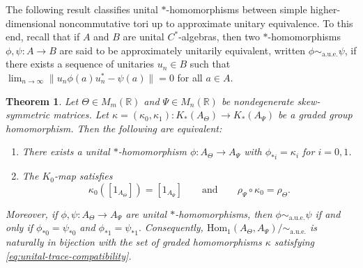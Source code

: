 \documentclass[11pt]{amsart}
\newtheorem{theorem}{Theorem}[section]
\theoremstyle{definition}
\theoremstyle{remark}
\newcommand{\R}{\mathbb{R}}
\newcommand{\aue}{\sim_{\mathrm{a.u.e.}}}
\begin{document}
The following result classifies unital $*$-homomorphisms between simple
higher-dimensional noncommutative tori up to approximate unitary equivalence. To this end, recall that if $A$ and $B$ are unital $C^*$-algebras, then two $*$-homomorphisms
$\phi,\psi\colon A\to B$ are said to be approximately unitarily equivalent,
written $\phi\aue\psi$, if there exists a sequence of unitaries
$u_n\in B$ such that $\lim_{n\to\infty}\|u_n\phi(a)u_n^*-\psi(a)\|=0$
for all $a\in A.$

\begin{theorem}
\label{thm:unital-classification}
Let $\Theta\in M_m(\R)$ and $\Psi\in M_n(\R)$ be nondegenerate
skew-symmetric matrices. Let $\kappa=(\kappa_0,\kappa_1)\colon K_*(A_\Theta)\to K_*(A_\Psi)$
be a graded group homomorphism. Then the following are equivalent:
\begin{enumerate}[label=\textup{(\roman*)}]
\item There exists a unital $*$-homomorphism
$\phi\colon A_\Theta\to A_\Psi$ with
$\phi_{*i}=\kappa_i$ for $i=0,1$.
\item The $K_0$-map satisfies
\begin{equation}\label{eq:unital-trace-compatibility}
\kappa_0([1_{A_\Theta}])=[1_{A_\Psi}]
\qquad\text{and}\qquad
\rho_\Psi\circ\kappa_0=\rho_\Theta.
\end{equation}
\end{enumerate}
Moreover, if $\phi,\psi\colon A_\Theta\to A_\Psi$ are unital
$*$-homomorphisms, then $\phi\aue\psi$
if and only if $\phi_{*0}=\psi_{*0}$
and $\phi_{*1}=\psi_{*1}.$
Consequently, $\mathrm{Hom}_1(A_\Theta,A_\Psi)/\!\aue$
is naturally in bijection with the set of graded homomorphisms
$\kappa$ satisfying \eqref{eq:unital-trace-compatibility}.
\end{theorem}
\end{document}

